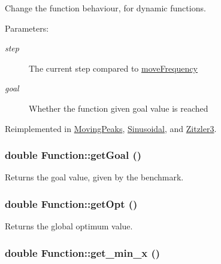Change the function behaviour, for dynamic functions. 

\begin{Desc}
\item[Parameters: ]\par
\begin{description}
\item[{\em 
step}]The current step compared to \hyperlink{classFunction_323cbb2de44582df3b9981e6c3416980}{moveFrequency} \item[{\em 
goal}]Whether the function given goal value is reached \end{description}
\end{Desc}


Reimplemented in \hyperlink{classMovingPeaks_84fcf2d3c8600f0dcd7f512ae70c19b4}{MovingPeaks}, \hyperlink{classSinusoidal_c3015c343f9854389f85fe441b838f17}{Sinusoidal}, and \hyperlink{classZitzler3_6beb6eca13774e5dd172f2a7d3f1f76f}{Zitzler3}.\hypertarget{classFunction_e6d1592d71358ccb6b1cab1e694ed52b}{
\subsubsection{\setlength{\rightskip}{0pt plus 5cm}double Function::getGoal ()}}
\label{classFunction_e6d1592d71358ccb6b1cab1e694ed52b}


Returns the goal value, given by the benchmark. 

\hypertarget{classFunction_cf92330874c4783b53c2d61733d418e5}{
\subsubsection{\setlength{\rightskip}{0pt plus 5cm}double Function::getOpt ()}}
\label{classFunction_cf92330874c4783b53c2d61733d418e5}


Returns the global optimum value. 

\hypertarget{classFunction_8831e5c15811e7090a9fcc2cdae162b6}{
\subsubsection{\setlength{\rightskip}{0pt plus 5cm}double Function::get\_\-min\_\-x ()}}
\label{classFunction_8831e5c15811e7090a9fcc2cdae162b6}


